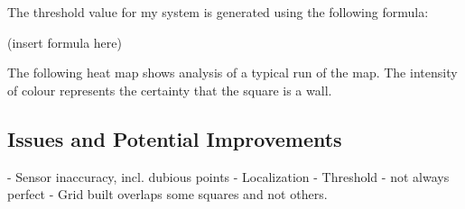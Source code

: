 \documentclass{article}
\begin{document}
The threshold value for my system is generated using the following formula:

(insert formula here)

The following heat map shows analysis of a typical run of the map. The intensity of colour represents the certainty that the square is a wall. 

\subsection{Issues and Potential Improvements}
- Sensor inaccuracy, incl. dubious points
- Localization
- Threshold -  not always perfect
- Grid built overlaps some squares and not others. 

\label{sec:issues}
\end{document}
